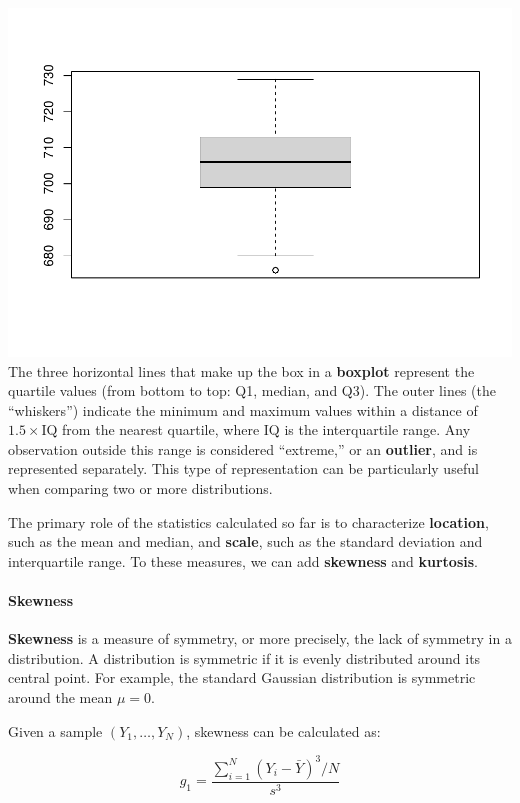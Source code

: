 \documentclass[
]{article}
\begin{document}
\includegraphics{EDA_files/figure-latex/unnamed-chunk-22-1.pdf} The
three horizontal lines that make up the box in a \textbf{boxplot}
represent the quartile values (from bottom to top: Q1, median, and Q3).
The outer lines (the ``whiskers'') indicate the minimum and maximum
values within a distance of \(1.5 \times \text{IQ}\) from the nearest
quartile, where \(\text{IQ}\) is the interquartile range. Any
observation outside this range is considered ``extreme,'' or an
\textbf{outlier}, and is represented separately. This type of
representation can be particularly useful when comparing two or more
distributions.

The primary role of the statistics calculated so far is to characterize
\textbf{location}, such as the mean and median, and \textbf{scale}, such
as the standard deviation and interquartile range. To these measures, we
can add \textbf{skewness} and \textbf{kurtosis}.

\hypertarget{skewness}{%
\paragraph{Skewness}\label{skewness}}

\textbf{Skewness} is a measure of symmetry, or more precisely, the lack
of symmetry in a distribution. A distribution is symmetric if it is
evenly distributed around its central point. For example, the standard
Gaussian distribution is symmetric around the mean \(\mu = 0\).

Given a sample \((Y_1, \ldots, Y_N)\), skewness can be calculated as:

\[
g_1 = \frac{\sum_{i=1}^N (Y_i - \bar{Y})^3 / N}{s^3}
\]
\end{document}
